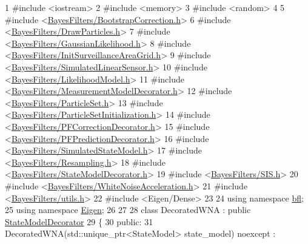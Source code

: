 \begin{DoxyCodeInclude}
1 \textcolor{preprocessor}{#include <iostream>}
2 \textcolor{preprocessor}{#include <memory>}
3 \textcolor{preprocessor}{#include <random>}
4 
5 \textcolor{preprocessor}{#include <\mbox{\hyperlink{BootstrapCorrection_8h}{BayesFilters/BootstrapCorrection.h}}>}
6 \textcolor{preprocessor}{#include <\mbox{\hyperlink{DrawParticles_8h}{BayesFilters/DrawParticles.h}}>}
7 \textcolor{preprocessor}{#include <\mbox{\hyperlink{GaussianLikelihood_8h}{BayesFilters/GaussianLikelihood.h}}>}
8 \textcolor{preprocessor}{#include <\mbox{\hyperlink{InitSurveillanceAreaGrid_8h}{BayesFilters/InitSurveillanceAreaGrid.h}}>}
9 \textcolor{preprocessor}{#include <\mbox{\hyperlink{SimulatedLinearSensor_8h}{BayesFilters/SimulatedLinearSensor.h}}>}
10 \textcolor{preprocessor}{#include <\mbox{\hyperlink{LikelihoodModel_8h}{BayesFilters/LikelihoodModel.h}}>}
11 \textcolor{preprocessor}{#include <\mbox{\hyperlink{MeasurementModelDecorator_8h}{BayesFilters/MeasurementModelDecorator.h}}>}
12 \textcolor{preprocessor}{#include <\mbox{\hyperlink{ParticleSet_8h}{BayesFilters/ParticleSet.h}}>}
13 \textcolor{preprocessor}{#include <\mbox{\hyperlink{ParticleSetInitialization_8h}{BayesFilters/ParticleSetInitialization.h}}>}
14 \textcolor{preprocessor}{#include <\mbox{\hyperlink{PFCorrectionDecorator_8h}{BayesFilters/PFCorrectionDecorator.h}}>}
15 \textcolor{preprocessor}{#include <\mbox{\hyperlink{PFPredictionDecorator_8h}{BayesFilters/PFPredictionDecorator.h}}>}
16 \textcolor{preprocessor}{#include <\mbox{\hyperlink{SimulatedStateModel_8h}{BayesFilters/SimulatedStateModel.h}}>}
17 \textcolor{preprocessor}{#include <\mbox{\hyperlink{Resampling_8h}{BayesFilters/Resampling.h}}>}
18 \textcolor{preprocessor}{#include <\mbox{\hyperlink{StateModelDecorator_8h}{BayesFilters/StateModelDecorator.h}}>}
19 \textcolor{preprocessor}{#include <\mbox{\hyperlink{SIS_8h}{BayesFilters/SIS.h}}>}
20 \textcolor{preprocessor}{#include <\mbox{\hyperlink{WhiteNoiseAcceleration_8h}{BayesFilters/WhiteNoiseAcceleration.h}}>}
21 \textcolor{preprocessor}{#include <\mbox{\hyperlink{utils_8h}{BayesFilters/utils.h}}>}
22 \textcolor{preprocessor}{#include <Eigen/Dense>}
23 
24 \textcolor{keyword}{using namespace }\mbox{\hyperlink{namespacebfl}{bfl}};
25 \textcolor{keyword}{using namespace }\mbox{\hyperlink{namespaceEigen}{Eigen}};
26 
27 
28 \textcolor{keyword}{class }DecoratedWNA : \textcolor{keyword}{public} \mbox{\hyperlink{classbfl_1_1StateModelDecorator}{StateModelDecorator}}
29 \{
30 \textcolor{keyword}{public}:
31     DecoratedWNA(std::unique\_ptr<StateModel> state\_model) noexcept :

\end{DoxyCodeInclude}
